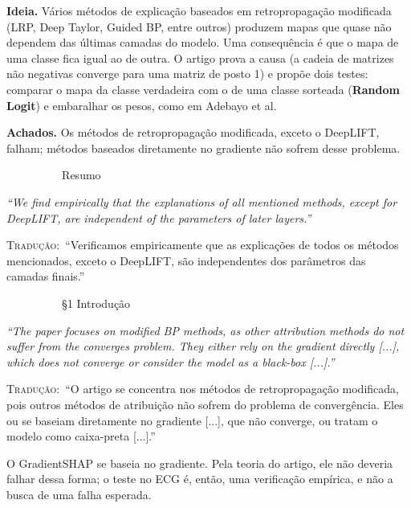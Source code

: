\documentclass[11pt,a4paper]{article}
\newcommand{\pagechip}[1]{{\setlength{\fboxsep}{1.5pt}\colorbox{cAcc}{\textcolor{white}{\scriptsize\texttt{#1}}}}}
\newenvironment{origquote}{\par\itshape\small}{\par}
\newenvironment{tradquote}{\par\small\textsc{Tradução:}\ }{\par}
\newcommand{\explab}[1]{\par\smallskip{\small\color{cAcc}\textbf{\MakeUppercase{#1}}}\par}
\begin{document}
\textbf{Ideia.} Vários métodos de explicação baseados em retropropagação modificada (LRP, Deep Taylor, Guided BP, entre outros) produzem mapas que quase não dependem das últimas camadas do modelo. Uma consequência é que o mapa de uma classe fica igual ao de outra. O artigo prova a causa (a cadeia de matrizes não negativas converge para uma matriz de posto 1) e propõe dois testes: comparar o mapa da classe verdadeira com o de uma classe sorteada (\textbf{Random Logit}) e embaralhar os pesos, como em Adebayo et al.

\textbf{Achados.} Os métodos de retropropagação modificada, exceto o DeepLIFT, falham; métodos baseados diretamente no gradiente não sofrem desse problema.

\begin{citacard}{\pagechip{Sixt p. 1} Resumo}
\begin{origquote}“We find empirically that the explanations of all mentioned methods, except for DeepLIFT, are independent of the parameters of later layers.”\end{origquote}
\begin{tradquote}“Verificamos empiricamente que as explicações de todos os métodos mencionados, exceto o DeepLIFT, são independentes dos parâmetros das camadas finais.”\end{tradquote}
\end{citacard}

\begin{citacard}{\pagechip{Sixt p. 2} §1 Introdução}
\begin{origquote}“The paper focuses on modified BP methods, as other attribution methods do not suffer from the converges problem. They either rely on the gradient directly [...], which does not converge or consider the model as a black-box [...].”\end{origquote}
\begin{tradquote}“O artigo se concentra nos métodos de retropropagação modificada, pois outros métodos de atribuição não sofrem do problema de convergência. Eles ou se baseiam diretamente no gradiente [...], que não converge, ou tratam o modelo como caixa-preta [...].”\end{tradquote}
\explab{Explicação}
O GradientSHAP se baseia no gradiente. Pela teoria do artigo, ele não deveria falhar dessa forma; o teste no ECG é, então, uma verificação empírica, e não a busca de uma falha esperada.
\end{citacard}
\end{document}
